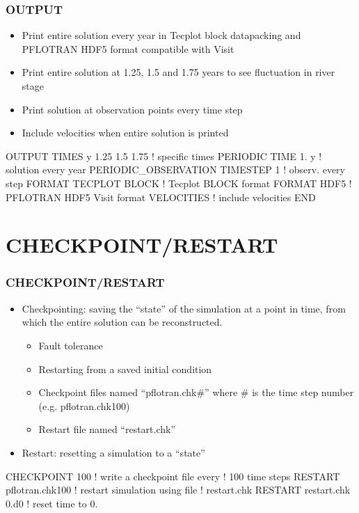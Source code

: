 \documentclass{beamer}
\newcommand\redcomment[1]{{{\color{red} #1}}}
\newcommand\bluecomment[1]{{{\color{blue} #1}}}
\begin{document}
\begin{frame}[fragile]\frametitle{OUTPUT}

\begin{itemize}
\item Print entire solution every year in Tecplot block datapacking and PFLOTRAN HDF5 format compatible with Visit
\item Print entire solution at 1.25, 1.5 and 1.75 years to see fluctuation in river stage
\item Print solution at observation points every time step
\item Include velocities when entire solution is printed
\end{itemize}

\begin{semiverbatim}

OUTPUT
  TIMES y 1.25 1.5 1.75  \bluecomment{! specific times}
  PERIODIC TIME 1. y     \bluecomment{! solution every year}
  PERIODIC_OBSERVATION TIMESTEP 1  \bluecomment{! observ. every step}
  FORMAT TECPLOT BLOCK   \bluecomment{! Tecplot BLOCK format}
  FORMAT HDF5            \bluecomment{! PFLOTRAN HDF5 Visit format}
  VELOCITIES             \bluecomment{! include velocities}
END
\end{semiverbatim}

\end{frame}

\section{CHECKPOINT/RESTART}

\begin{frame}[fragile]\frametitle{CHECKPOINT/RESTART}

\begin{itemize}
\item Checkpointing: saving the ``state'' of the simulation at a point in time, from which the entire solution can be reconstructed.
  \begin{itemize}
    \item Fault tolerance
    \item Restarting from a saved initial condition
    \item Checkpoint files named ``pflotran.chk\#'' where \# is the time step number (e.g. pflotran.chk100)
    \item Restart file named ``restart.chk''
  \end{itemize}
\item Restart: resetting a simulation to a ``state''
\end{itemize}


\begin{semiverbatim}

CHECKPOINT 100          \bluecomment{! write a checkpoint file every}
                        \bluecomment{!   100 time steps}
RESTART pflotran.chk100 \bluecomment{! restart simulation using file}
                        \bluecomment{!   \redcomment{restart.chk}}
RESTART restart.chk \redcomment{0.d0}  \bluecomment{! reset time to 0.}
\end{semiverbatim}

\end{frame}
\end{document}
